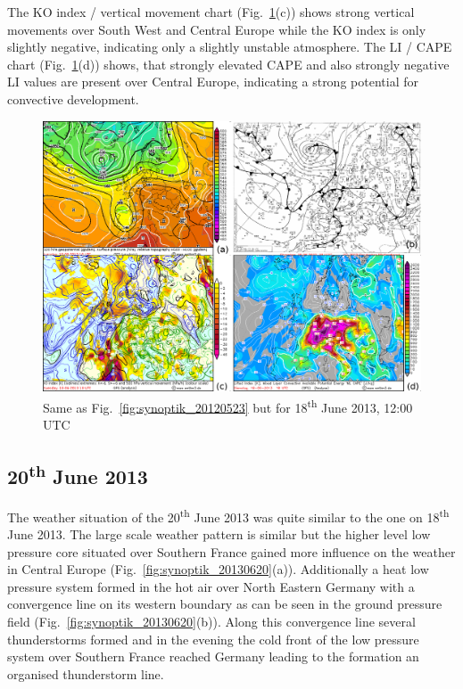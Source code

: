 The KO index / vertical movement chart (Fig.~\ref{fig:synoptik_20130618}(c)) shows strong vertical movements over South West and Central Europe while the KO index is only slightly negative, indicating only a slightly unstable atmosphere. The LI / CAPE chart (Fig.~\ref{fig:synoptik_20130618}(d)) shows, that strongly elevated CAPE and also strongly negative LI values are present over Central Europe, indicating a strong potential for convective development.

\begin{figure}[htbp]
	\centering
	\includegraphics[width=\linewidth]{Grafiken/Abbildungen/synoptik_20130618.png}
	\caption{Same as Fig.~\ref{fig:synoptik_20120523} but for 18\textsuperscript{th} June 2013, 12:00 UTC}
    \label{fig:synoptik_20130618}  
\end{figure}


\subsection{20\textsuperscript{th} June 2013}
The weather situation of the 20\textsuperscript{th} June 2013 was quite similar to the one on 18\textsuperscript{th} June 2013. The large scale weather pattern is similar but the higher level low pressure core situated over Southern France gained more influence on the weather in Central Europe (Fig.~\ref{fig:synoptik_20130620}(a)). Additionally a heat low pressure system formed in the hot air over North Eastern Germany with a convergence line on its western boundary as can be seen in the ground pressure field (Fig.~\ref{fig:synoptik_20130620}(b)). Along this convergence line several thunderstorms formed and in the evening the cold front of the low pressure system over Southern France reached Germany leading to the formation an organised thunderstorm line.

